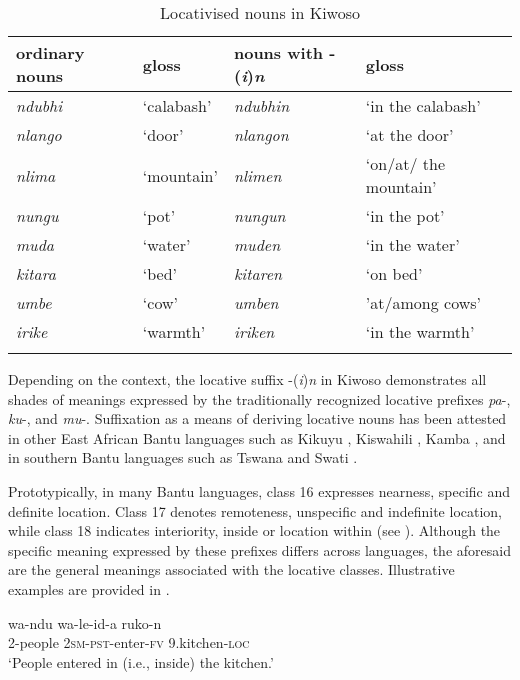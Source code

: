 \documentclass[output=paper]{langscibook}
\begin{document}
\begin{table}
\begin{tabular}{llll}
\lsptoprule
{ordinary nouns} & {gloss} & nouns with -(\textit{i})\textit{n} & {gloss}\\
\midrule
{\itshape ndubhi} & { {‘calabash’}} & {\itshape ndubhin} & { {‘in the calabash’}}\\
{\itshape nlango} & { {‘door’}} & {\itshape nlangon} & { {‘at the door’}}\\
{\itshape nlima} & { {‘mountain’}} & {\itshape nlimen} & { {‘on/at/ the mountain’}}\\
{\itshape nungu} & { {‘pot’}} & {\itshape nungun} & { {‘in the pot’}}\\
{\itshape muda} & { {‘water’}} & {\itshape muden} & { {‘in the water’}}\\
{\itshape kitara} & { {‘bed’}} & {\itshape kitaren} & { {‘on bed’}}\\
{\itshape umbe} & { {‘cow’}} & {\itshape umben} & { {'at/among cows'}}\\
{\itshape irike} & { {‘warmth’}} & {\itshape iriken} & { {‘in the warmth’}}\\
\lspbottomrule
\end{tabular}
\caption{\label{tab:mallya:2} Locativised nouns in Kiwoso}
\end{table}


{Depending on the context, the locative suffix -(}{\textit{i}}){\textit{n}} {in Kiwoso demonstrates all shades of meanings expressed by the traditionally recognized locative prefixes} {\textit{pa}}{{}-,} {\textit{ku}}{{}-, and} {\textit{mu}}{{}-.} {Suffixation as a means of deriving locative nouns has been attested in other East African Bantu languages such as Kikuyu \citep{Mugane1997}, Kiswahili \citep{Grégoire1975}, Kamba \citep{Kioko2005}, and in southern Bantu languages such as Tswana \citep{Creissels2011} and Swati \citep{Marten2010}.} 


Prototypically, in many Bantu languages, class 16 expresses nearness, specific and definite location. Class 17 denotes remoteness, unspecific and indefinite location, while class 18 indicates interiority, inside or location within (see \citealt{Grégoire1975, Maho1999, Fleisch2005cognitive, MartenEtAl2007, Guérois2016}). Although the specific meaning expressed by these prefixes differs across languages, the aforesaid are the general meanings associated with the locative classes. Illustrative examples are provided in .

\ea\label{ex:mallya:5}      
    \ea\label{ex:mallya:5a}
    \gll wa-ndu      wa-le-id-a      ruko-n\\
        2-people    2\textsc{sm}-\textsc{pst}-enter-\textsc{fv}    9.kitchen-\textsc{loc}\\
    \glt ‘People entered in (i.e., inside) the kitchen.’
\end{document}
